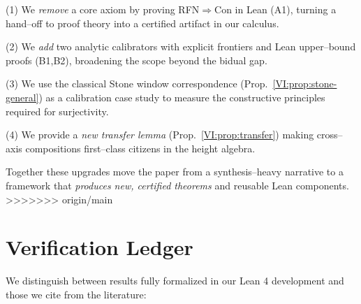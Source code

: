 \documentclass[11pt]{article}
\theoremstyle{definition}
\theoremstyle{remark}
\begin{document}
(1) We \emph{remove} a core axiom by proving RFN\(\Rightarrow\)Con in Lean (A1), turning a hand–off to proof theory into a certified artifact in our calculus.

(2) We \emph{add} two analytic calibrators with explicit frontiers and Lean upper–bound proofs (B1,B2), broadening the scope beyond the bidual gap.

(3) We use the classical Stone window correspondence (Prop.~\ref{VI:prop:stone-general}) as a calibration case study to measure the constructive principles required for surjectivity.

(4) We provide a \emph{new transfer lemma} (Prop.~\ref{VI:prop:transfer}) making cross–axis compositions first–class citizens in the height algebra.

Together these upgrades move the paper from a synthesis–heavy narrative to a framework that \emph{produces new, certified theorems} and reusable Lean components.
>>>>>>> origin/main










\section{Verification Ledger}\label{sec:verification}

We distinguish between results fully formalized in our Lean 4 development and those we cite from the literature:
\end{document}
